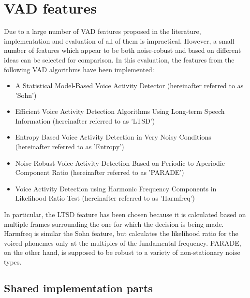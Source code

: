 
\section{VAD features}

Due to a large number of VAD features proposed in the literature, implementation and evaluation of all of them is impractical. However, a small number of features which appear to be both noise-robust and based on different ideas can be selected for comparison. In this evaluation, the features from the following VAD algorithms have been implemented:

\begin{itemize}
\item A Statistical Model-Based Voice Activity Detector \cite{Sohn} (hereinafter referred to as 'Sohn')
\item Efficient Voice Activity Detection Algorithms Using Long-term Speech Information \cite{LTSD} (hereinafter referred to as 'LTSD')
\item Entropy Based Voice Activity Detection in Very Noisy Conditions \citep{Renevey} (hereinafter referred to as 'Entropy')
\item Noise Robust Voice Activity Detection Based on Periodic to Aperiodic Component Ratio \cite{PARADE} (hereinafter referred to as 'PARADE')
\item Voice Activity Detection using Harmonic Frequency Components in Likelihood Ratio Test \cite{Tan} (hereinafter referred to as 'Harmfreq')
\end{itemize}

In particular, the LTSD feature has been chosen because it is calculated based on multiple frames surrounding the one for which the decision is being made. Harmfreq is similar the Sohn feature, but calculates the likelihood ratio for the voiced phonemes only at the multiples of the fundamental frequency. PARADE, on the other hand, is supposed to be robust to a variety of non-stationary noise types.

\subsection{Shared implementation parts}

